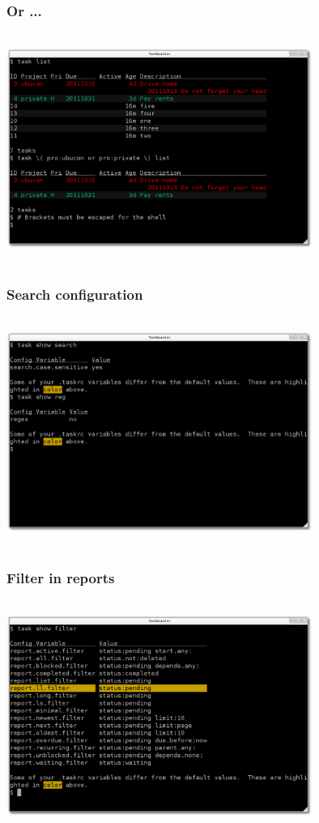 \documentclass[t,handout]{beamer}
\begin{document}
\begin{frame}
\frametitle{Or ...}
\begin{center}
\includegraphics[width=10cm,height=7.5cm]{filter_or.png}
\end{center}
\end{frame}

\begin{frame}
\frametitle{Search configuration}
\begin{center}
\includegraphics[width=10cm,height=7.5cm]{filter_config.png}
\end{center}
\end{frame}

\begin{frame}
\frametitle{Filter in reports}
\begin{center}
\includegraphics[width=10cm,height=7.5cm]{filter_reports.png}
\end{center}
\end{frame}
\end{document}
